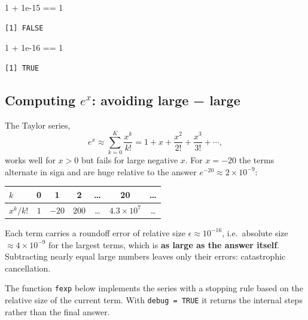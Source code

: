 \documentclass[
  letterpaper,
  DIV=11,
  numbers=noendperiod]{scrreprt}
\newenvironment{Shaded}{\begin{snugshade}}{\end{snugshade}}
\newcommand{\DecValTok}[1]{\textcolor[rgb]{0.68,0.00,0.00}{#1}}
\newcommand{\FloatTok}[1]{\textcolor[rgb]{0.68,0.00,0.00}{#1}}
\newcommand{\SpecialCharTok}[1]{\textcolor[rgb]{0.37,0.37,0.37}{#1}}
\newcounter{none} %
\begin{document}
\begin{Shaded}
\begin{Highlighting}[]
\DecValTok{1} \SpecialCharTok{+} \FloatTok{1e{-}15} \SpecialCharTok{==} \DecValTok{1}
\end{Highlighting}
\end{Shaded}

\begin{verbatim}
[1] FALSE
\end{verbatim}

\begin{Shaded}
\begin{Highlighting}[]
\DecValTok{1} \SpecialCharTok{+} \FloatTok{1e{-}16} \SpecialCharTok{==} \DecValTok{1}
\end{Highlighting}
\end{Shaded}

\begin{verbatim}
[1] TRUE
\end{verbatim}

\subsection{\texorpdfstring{Computing \(e^x\): avoiding large −
large}{Computing e\^{}x: avoiding large − large}}\label{computing-ex-avoiding-large-large}

The Taylor series, \[
e^x \approx \sum_{k=0}^{K}\frac{x^k}{k!} = 1 + x + \frac{x^2}{2!} + \frac{x^3}{3!} + \cdots,
\] works well for \(x > 0\) but fails for large negative \(x\). For
\(x = -20\) the terms alternate in sign and are huge relative to the
answer \(e^{-20}\approx 2\times10^{-9}\):

{\def\LTcaptype{none} %
\begin{longtable}[]{@{}lcccccc@{}}
\toprule\noalign{}
\(k\) & 0 & 1 & 2 & \ldots{} & 20 & \ldots{} \\
\midrule\noalign{}
\endhead
\bottomrule\noalign{}
\endlastfoot
\(x^k/k!\) & \(1\) & \(-20\) & \(200\) & \ldots{} & \(4.3\times10^{7}\)
& \ldots{} \\
\end{longtable}
}

Each term carries a roundoff error of relative size
\(\epsilon \approx 10^{-16}\), i.e.~absolute size
\(\approx 4\times10^{-9}\) for the largest terms, which is \textbf{as
large as the answer itself}. Subtracting nearly equal large numbers
leaves only their errors: catastrophic cancellation.

The function \texttt{fexp} below implements the series with a stopping
rule based on the relative size of the current term. With
\texttt{debug\ =\ TRUE} it returns the internal steps rather than the
final answer.
\end{document}
